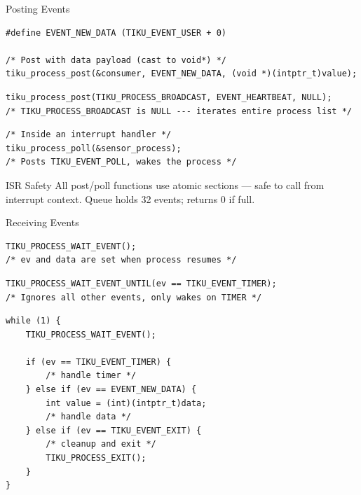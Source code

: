 \documentclass[aspectratio=169, 10pt]{beamer}
\begin{document}
\begin{frame}[fragile]{Posting Events}
\begin{lstlisting}[style=cstyle, title={Post to a single process}]
#define EVENT_NEW_DATA (TIKU_EVENT_USER + 0)

/* Post with data payload (cast to void*) */
tiku_process_post(&consumer, EVENT_NEW_DATA, (void *)(intptr_t)value);
\end{lstlisting}

\begin{lstlisting}[style=cstyle, title={Broadcast to all processes}]
tiku_process_post(TIKU_PROCESS_BROADCAST, EVENT_HEARTBEAT, NULL);
/* TIKU_PROCESS_BROADCAST is NULL --- iterates entire process list */
\end{lstlisting}

\begin{lstlisting}[style=cstyle, title={Poll from ISR}]
/* Inside an interrupt handler */
tiku_process_poll(&sensor_process);
/* Posts TIKU_EVENT_POLL, wakes the process */
\end{lstlisting}

\vspace{0.3em}
\begin{block}{ISR Safety}
All post/poll functions use atomic sections ---
safe to call from interrupt context.
Queue holds 32 events; returns 0 if full.
\end{block}
\end{frame}

\begin{frame}[fragile]{Receiving Events}
\begin{lstlisting}[style=cstyle, title={Wait for any event}]
TIKU_PROCESS_WAIT_EVENT();
/* ev and data are set when process resumes */
\end{lstlisting}

\begin{lstlisting}[style=cstyle, title={Wait for a specific event}]
TIKU_PROCESS_WAIT_EVENT_UNTIL(ev == TIKU_EVENT_TIMER);
/* Ignores all other events, only wakes on TIMER */
\end{lstlisting}

\begin{lstlisting}[style=cstyle, title={Event dispatch loop pattern}]
while (1) {
    TIKU_PROCESS_WAIT_EVENT();

    if (ev == TIKU_EVENT_TIMER) {
        /* handle timer */
    } else if (ev == EVENT_NEW_DATA) {
        int value = (int)(intptr_t)data;
        /* handle data */
    } else if (ev == TIKU_EVENT_EXIT) {
        /* cleanup and exit */
        TIKU_PROCESS_EXIT();
    }
}
\end{lstlisting}
\end{frame}
\end{document}
